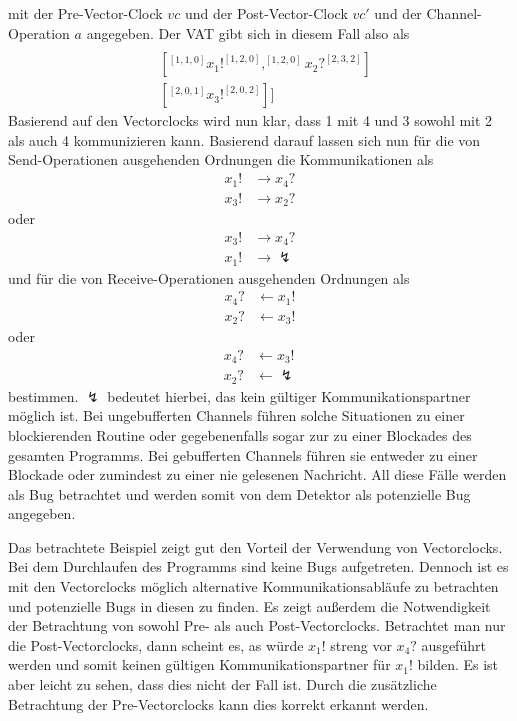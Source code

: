mit der Pre-Vector-Clock $vc$ und der 
Post-Vector-Clock $vc'$ und der Channel-Operation $a$ angegeben.
Der VAT gibt sich in diesem Fall also als
\begin{align*}
  [&[^{[2,0,0]}x_4?^{[3,2,0]}]\\
  &[^{[1, 1, 0]}x_1!^{[1, 2, 0]}, ^{[1, 2, 0]}x_2?^{[2, 3, 2]}]\\
  &[^{[2, 0, 1]}x_3!^{[2, 0, 2]}]]
\end{align*}
Basierend auf den Vectorclocks wird nun klar, dass 1 mit 4 und 3 sowohl mit 
2 als auch 4 kommunizieren kann. Basierend darauf lassen sich nun für die 
von Send-Operationen ausgehenden Ordnungen die Kommunikationen als
  \begin{align*}
    x_1! &\to x_4?  \\
    x_3! &\to x_2?  
  \end{align*}
oder 
\begin{align*}
  x_3! &\to x_4?\\
  x_1! &\to \lightning
\end{align*}
und für die von Receive-Operationen ausgehenden Ordnungen als
  \begin{align*}
    x_4? &\leftarrow x_1!\\
    x_2? &\leftarrow x_3!
  \end{align*}
  oder 
  \begin{align*}
    x_4? &\leftarrow x_3!\\
    x_2? &\leftarrow \lightning
  \end{align*}
  bestimmen.
$\lightning$ bedeutet hierbei, das kein gültiger Kommunikationspartner möglich ist.
Bei ungebufferten Channels führen solche Situationen zu einer blockierenden Routine
oder gegebenenfalls sogar zur zu einer Blockades des gesamten Programms.
Bei gebufferten Channels führen sie entweder zu einer Blockade oder zumindest 
zu einer nie gelesenen Nachricht. All diese Fälle werden als Bug betrachtet
und werden somit von dem Detektor als potenzielle Bug angegeben.

Das betrachtete Beispiel zeigt gut den Vorteil der Verwendung von Vectorclocks.
Bei dem Durchlaufen des Programms sind keine Bugs aufgetreten. Dennoch 
ist es mit den Vectorclocks möglich alternative Kommunikationsabläufe 
zu betrachten und potenzielle Bugs in diesen zu finden. Es zeigt außerdem 
die Notwendigkeit der Betrachtung von sowohl Pre- als auch Post-Vectorclocks.
Betrachtet man nur die Post-Vectorclocks, dann scheint es, as würde $x_1!$
streng vor $x_4?$ ausgeführt werden und somit keinen gültigen Kommunikationspartner
für $x_1!$ bilden. Es ist aber leicht zu sehen, dass dies nicht der Fall ist. 
Durch die zusätzliche Betrachtung der Pre-Vectorclocks kann dies korrekt erkannt werden.

